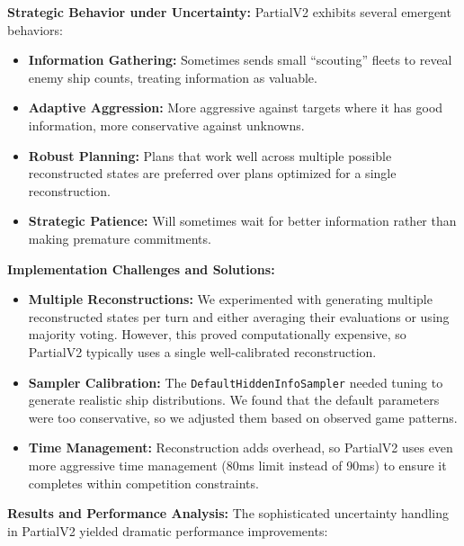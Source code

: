 \documentclass[conference]{IEEEtran}
\begin{document}
\textbf{Strategic Behavior under Uncertainty:} PartialV2 exhibits several emergent behaviors:

\begin{itemize}
\item \textbf{Information Gathering:} Sometimes sends small ``scouting'' fleets to reveal enemy ship counts, treating information as valuable.

\item \textbf{Adaptive Aggression:} More aggressive against targets where it has good information, more conservative against unknowns.

\item \textbf{Robust Planning:} Plans that work well across multiple possible reconstructed states are preferred over plans optimized for a single reconstruction.

\item \textbf{Strategic Patience:} Will sometimes wait for better information rather than making premature commitments.
\end{itemize}

\textbf{Implementation Challenges and Solutions:}

\begin{itemize}
\item \textbf{Multiple Reconstructions:} We experimented with generating multiple reconstructed states per turn and either averaging their evaluations or using majority voting. However, this proved computationally expensive, so PartialV2 typically uses a single well-calibrated reconstruction.

\item \textbf{Sampler Calibration:} The \texttt{DefaultHiddenInfo\linebreak Sampler} needed tuning to generate realistic ship distributions. We found that the default parameters were too conservative, so we adjusted them based on observed game patterns.

\item \textbf{Time Management:} Reconstruction adds overhead, so PartialV2 uses even more aggressive time management (80ms limit instead of 90ms) to ensure it completes within competition constraints.
\end{itemize}

\textbf{Results and Performance Analysis:} The sophisticated uncertainty handling in PartialV2 yielded dramatic performance improvements:
\end{document}
